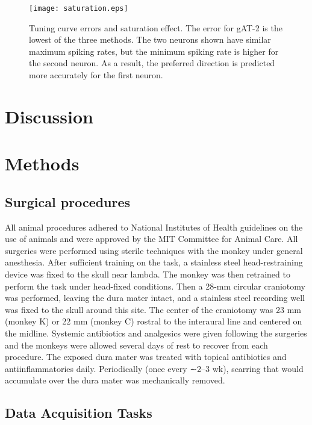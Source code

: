 \documentclass[10 pt]{article}
\begin{document}
\begin{figure}[htbp]
\begin{center}
\texttt{[image: saturation.eps]}
\label{fig:saturation}
\caption{Tuning curve errors and saturation effect. The error for gAT-2 is the lowest of the three methods. The two neurons shown have similar maximum spiking rates, but the minimum spiking rate is higher for the second neuron. As a result, the preferred direction is predicted more accurately for the first neuron.}
\end{center}
\end{figure}








\section{Discussion}


\section{Methods}

\subsection{Surgical procedures}

All animal procedures adhered to National Institutes of Health guidelines on the use of animals and were approved by the MIT Committee for Animal Care.
All surgeries were performed using sterile techniques with the monkey under general anesthesia. After sufficient training on the task, a stainless steel head-restraining device was fixed to the skull near lambda. The monkey was then retrained to perform the task under head-fixed conditions. Then a 28-mm circular craniotomy was performed, leaving the dura mater intact, and a stainless steel recording well was fixed to the skull around this site. The center of the craniotomy was 23 mm (monkey K) or 22 mm (monkey C) rostral to the interaural line and centered on the midline. Systemic antibiotics and analgesics were given following the surgeries and the monkeys were allowed several days of rest to recover from each procedure. The exposed dura mater was treated with topical antibiotics and antiinflammatories daily. Periodically (once every ∼2–3 wk), scarring that would accumulate over the dura mater was mechanically removed.

\subsection{Data Acquisition Tasks}
\end{document}
